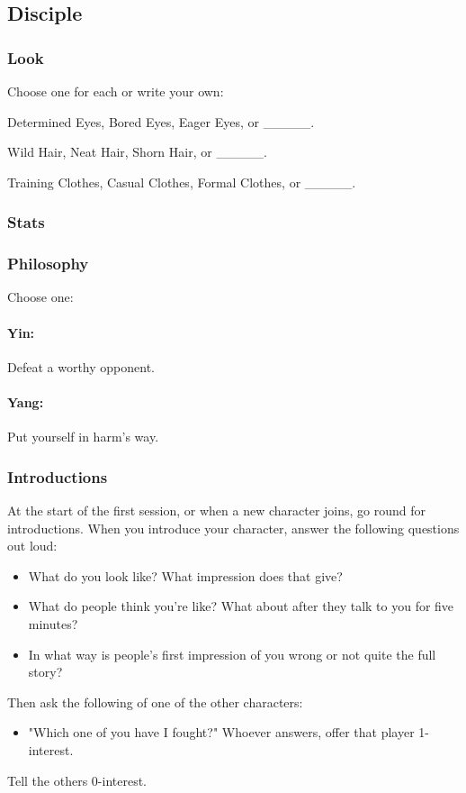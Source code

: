 \subsection{Disciple}
{\itshape
}

\subsubsection{Look}
Choose one for each or write your own:

Determined Eyes, Bored Eyes, Eager Eyes, or \_\_\_\_\_.

Wild Hair, Neat Hair, Shorn Hair, or \_\_\_\_\_.

Training Clothes, Casual Clothes, Formal Clothes, or \_\_\_\_\_.

\subsubsection{Stats}

\subsubsection{Philosophy}
Choose one:
\paragraph{Yin:} Defeat a worthy opponent.
\paragraph{Yang:} Put yourself in harm's way.

\subsubsection{Introductions}
At the start of the first session, or when a new character joins, go round for introductions.
When you introduce your character, answer the following questions out loud:
\begin{itemize}
\item What do you look like? What impression does that give?
\item What do people think you're like? What about after they talk to you for five minutes?
\item In what way is people's first impression of you wrong or not quite the full story?
\end{itemize}

Then ask the following of one of the other characters:
\begin{itemize}
\item "Which one of you have I fought?" Whoever answers, offer that player 1-interest.
\end{itemize}
Tell the others 0-interest.

